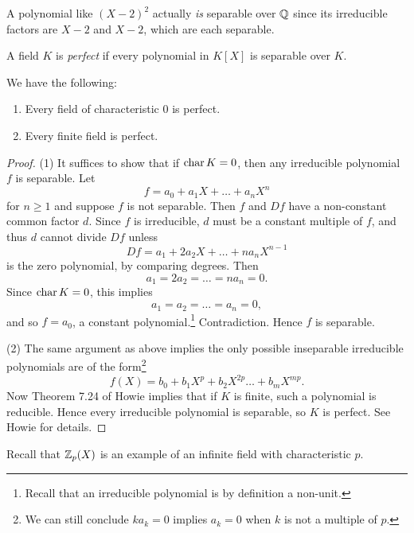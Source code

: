 \begin{remark}
  A polynomial like $(X - 2)^2$ actually \emph{is}
  separable
  over $\mathbb{Q}$ since its irreducible factors are
  $X - 2$ and $X - 2$, which are each separable.
\end{remark}

\begin{definition}
  A field $K$ is \emph{perfect} if every polynomial
  in $K[X]$ is separable over $K$.
\end{definition}

\begin{theorem}
  We have the following:
  \begin{enumerate}
    \item Every field of characteristic $0$ is perfect.
    \item Every finite field is perfect.
  \end{enumerate}
\end{theorem}

\begin{proof}
  (1) It suffices to show that if $\operatorname{char} K = 0$, then
  any irreducible polynomial $f$ is separable. Let
  \[
    f = a_0 + a_1 X + \dots + a_n X^n
  \]
  for $n \ge 1$ and suppose $f$ is not separable. Then
  $f$ and $Df$ have a non-constant common factor $d$.
  Since $f$ is irreducible, $d$ must be a constant
  multiple of $f$, and thus $d$ cannot divide $Df$
  unless
  \[
    Df = a_1 + 2a_2 X + \dots + na_n X^{n-1}
  \]
  is the zero polynomial, by comparing degrees. Then
  \[
    a_1 = 2a_2 = \dots = na_n = 0.
  \]
  Since $\operatorname{char} K = 0$, this implies
  \[a_1 = a_2 = \dots = a_n = 0,\]
  and so $f = a_0$,
  a constant polynomial.\footnote{Recall that an irreducible polynomial is by definition a non-unit.}
  Contradiction. Hence $f$ is separable.

  (2) The same argument as above implies the only possible
  inseparable irreducible polynomials are of the form\footnote{We can still conclude $ka_k = 0$ implies $a_k = 0$ when $k$ is not a multiple of $p$.}
  \[
    f(X) = b_0 + b_1 X^p + b_2 X^{2p} \dots + b_{m} X^{mp}.
  \]
  Now Theorem 7.24 of Howie implies that if $K$ is finite,
  such a polynomial is reducible. Hence every irreducible
  polynomial is separable, so $K$ is perfect. See Howie
  for details.
\end{proof}

\begin{remark}
  Recall that $\mathbb{Z}_p(X)$ is an example of an infinite
  field with characteristic $p$.
\end{remark}
